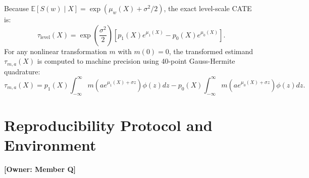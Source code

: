 \documentclass[11pt,a4paper]{article}
\newcommand{\taulevel}{\tau_{\text{level}}}
\newcommand{\tauma}{\tau_{m, a}}
\newcommand{\E}{\mathbb{E}}
\begin{document}
Because $\E[S(w) \mid X] = \exp(\mu_w(X) + \sigma^2/2)$, the exact level-scale CATE is:
\begin{equation}
\boxed{\taulevel(X) = \exp\left(\frac{\sigma^2}{2}\right) \left[ p_1(X) e^{\mu_1(X)} - p_0(X) e^{\mu_0(X)} \right].}
\end{equation}
For any nonlinear transformation $m$ with $m(0)=0$, the transformed estimand $\tauma(X)$ is computed to machine precision using 40-point Gauss-Hermite quadrature:
\begin{equation}
\tauma(X) = p_1(X) \int_{-\infty}^{\infty} m\left(a e^{\mu_1(X) + \sigma z}\right) \phi(z) dz - p_0(X) \int_{-\infty}^{\infty} m\left(a e^{\mu_0(X) + \sigma z}\right) \phi(z) dz.
\end{equation}

\section{Reproducibility Protocol and Environment}
\label{app:repro}
\noindent \textbf{[Owner: Member Q]}
\end{document}
